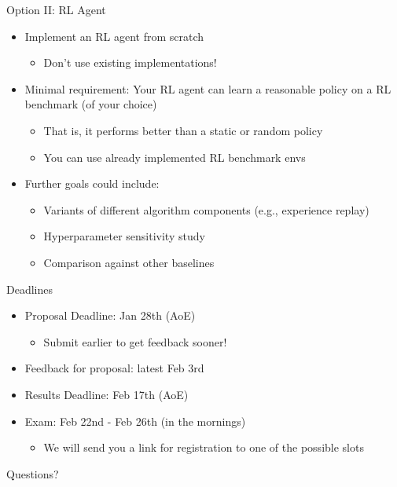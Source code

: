 \begin{frame}[c]{Option II: RL Agent}
	
	\begin{itemize}
		\item Implement an RL agent from scratch
		\begin{itemize}
			\item Don't use existing implementations!
		\end{itemize}
		\item Minimal requirement: Your RL agent can learn a reasonable policy on a RL benchmark (of your choice)
		\begin{itemize}
			\item That is, it performs better than a static or random policy
			\item You can use already implemented RL benchmark envs
		\end{itemize}
		\item Further goals could include:
		\begin{itemize}
			\item Variants of different algorithm components (e.g., experience replay)
			\item Hyperparameter sensitivity study
			\item Comparison against other baselines
		\end{itemize}
	\end{itemize}
	
\end{frame}
\begin{frame}[c]{Deadlines}
	
	\begin{itemize}
		\item Proposal Deadline: Jan 28th (AoE) 
		\begin{itemize}
			\item Submit earlier to get feedback sooner!
		\end{itemize}
		\item Feedback for proposal: latest Feb 3rd
		\item Results Deadline: Feb 17th (AoE) 
		\item Exam: Feb 22nd - Feb 26th (in the mornings)
		\begin{itemize}
			\item We will send you a link for registration to one of the possible slots
		\end{itemize}
	\end{itemize}
	
\end{frame}


\begin{frame}[c]{}
	
	\centering
	\huge
	Questions?
	
\end{frame}



